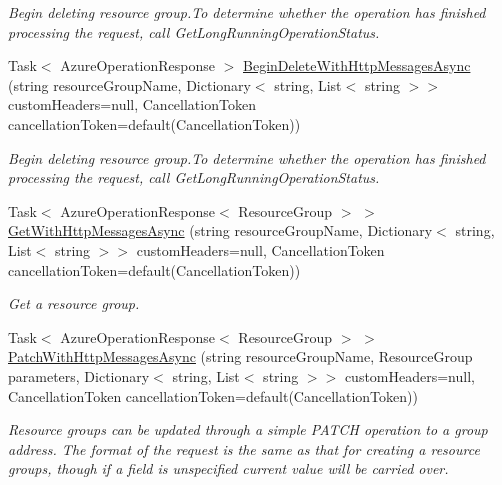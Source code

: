 \begin{DoxyCompactItemize}
\begin{DoxyCompactList}\small\item\em Begin deleting resource group.\+To determine whether the operation has finished processing the request, call Get\+Long\+Running\+Operation\+Status. \end{DoxyCompactList}\item 
Task$<$ Azure\+Operation\+Response $>$ \hyperlink{interface_microsoft_1_1_azure_1_1_management_1_1_resources_1_1_i_resource_groups_operations_a7b5d2d271fb9fe842fb627dbc0a38806}{Begin\+Delete\+With\+Http\+Messages\+Async} (string resource\+Group\+Name, Dictionary$<$ string, List$<$ string $>$$>$ custom\+Headers=null, Cancellation\+Token cancellation\+Token=default(Cancellation\+Token))
\begin{DoxyCompactList}\small\item\em Begin deleting resource group.\+To determine whether the operation has finished processing the request, call Get\+Long\+Running\+Operation\+Status. \end{DoxyCompactList}\item 
Task$<$ Azure\+Operation\+Response$<$ Resource\+Group $>$ $>$ \hyperlink{interface_microsoft_1_1_azure_1_1_management_1_1_resources_1_1_i_resource_groups_operations_abadfed412e54bc9a0ebc5d001184040f}{Get\+With\+Http\+Messages\+Async} (string resource\+Group\+Name, Dictionary$<$ string, List$<$ string $>$$>$ custom\+Headers=null, Cancellation\+Token cancellation\+Token=default(Cancellation\+Token))
\begin{DoxyCompactList}\small\item\em Get a resource group. \end{DoxyCompactList}\item 
Task$<$ Azure\+Operation\+Response$<$ Resource\+Group $>$ $>$ \hyperlink{interface_microsoft_1_1_azure_1_1_management_1_1_resources_1_1_i_resource_groups_operations_ac992635f11c74fc91f052ddab684e7ce}{Patch\+With\+Http\+Messages\+Async} (string resource\+Group\+Name, Resource\+Group parameters, Dictionary$<$ string, List$<$ string $>$$>$ custom\+Headers=null, Cancellation\+Token cancellation\+Token=default(Cancellation\+Token))
\begin{DoxyCompactList}\small\item\em Resource groups can be updated through a simple P\+A\+T\+CH operation to a group address. The format of the request is the same as that for creating a resource groups, though if a field is unspecified current value will be carried over. \end{DoxyCompactList}\item 
$$
\end{DoxyCompactItemize}
